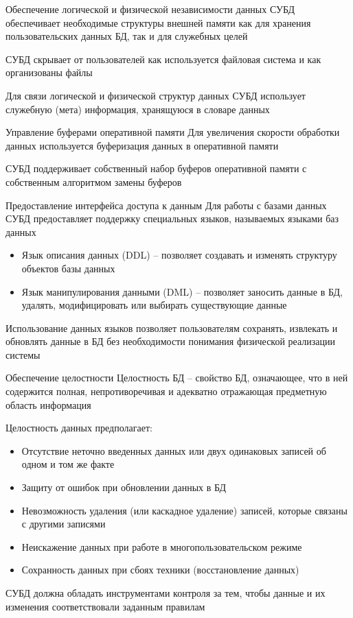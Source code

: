 \documentclass[12pt]{article}
\begin{document}
\begin{nota}{Обеспечение логической и физической независимости данных}
    СУБД обеспечивает необходимые структуры внешней памяти как для хранения пользовательских данных БД, так и для служебных целей

    СУБД скрывает от пользователей как используется файловая система и как организованы файлы

    Для связи логической и физической структур данных СУБД использует служебную (мета) информация, хранящуюся в словаре данных
\end{nota}

\begin{nota}{Управление буферами оперативной памяти}
    Для увеличения скорости обработки данных используется буферизация данных в оперативной памяти

    СУБД поддерживает собственный набор буферов оперативной памяти с собственным алгоритмом замены буферов
\end{nota}

\begin{nota}{Предоставление интерфейса доступа к данным}
    Для работы с базами данных СУБД предоставляет поддержку специальных языков, называемых языками баз данных

    \begin{itemize}
        \item Язык описания данных (DDL) -- позволяет создавать и изменять структуру объектов базы данных
        \item Язык манипулирования данными (DML) -- позволяет заносить данные в БД, удалять, модифицировать или выбирать существующие данные
    \end{itemize}

    Использование данных языков позволяет пользователям сохранять, извлекать и обновлять данные в БД без необходимости понимания физической реализации системы
\end{nota}

\begin{nota}{Обеспечение целостности}
    Целостность БД -- свойство БД, означающее, что в ней содержится полная, непротиворечивая и адекватно отражающая предметную область информация 

    Целостность данных предполагает:
    
    \begin{itemize}
        \item Отсутствие неточно введенных данных или двух одинаковых записей об одном и том же факте
        \item Защиту от ошибок при обновлении данных в БД
        \item Невозможность удаления (или каскадное удаление) записей, которые связаны с другими записями
        \item Неискажение данных при работе в многопользовательском режиме
        \item Сохранность данных при сбоях техники (восстановление данных)
    \end{itemize}

    СУБД должна обладать инструментами контроля за тем, чтобы данные и их изменения соответствовали заданным правилам 
\end{nota}
\end{document}
